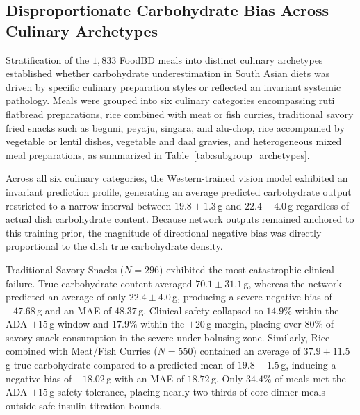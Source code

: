 \documentclass[utf8]{FrontiersinVancouver}
\begin{document}
\subsection{Disproportionate Carbohydrate Bias Across Culinary Archetypes}

Stratification of the $1,833$ FoodBD meals into distinct culinary archetypes established whether carbohydrate underestimation in South Asian diets was driven by specific culinary preparation styles or reflected an invariant systemic pathology. Meals were grouped into six culinary categories encompassing ruti flatbread preparations, rice combined with meat or fish curries, traditional savory fried snacks such as beguni, peyaju, singara, and alu-chop, rice accompanied by vegetable or lentil dishes, vegetable and daal gravies, and heterogeneous mixed meal preparations, as summarized in Table~\ref{tab:subgroup_archetypes}.

Across all six culinary categories, the Western-trained vision model exhibited an invariant prediction profile, generating an average predicted carbohydrate output restricted to a narrow interval between $19.8 \pm 1.3$\,g and $22.4 \pm 4.0$\,g regardless of actual dish carbohydrate content. Because network outputs remained anchored to this training prior, the magnitude of directional negative bias was directly proportional to the dish true carbohydrate density.

Traditional Savory Snacks ($N=296$) exhibited the most catastrophic clinical failure. True carbohydrate content averaged $70.1 \pm 31.1$\,g, whereas the network predicted an average of only $22.4 \pm 4.0$\,g, producing a severe negative bias of $-47.68$\,g and an MAE of $48.37$\,g. Clinical safety collapsed to $14.9\%$ within the ADA $\pm 15$\,g window and $17.9\%$ within the $\pm 20$\,g margin, placing over $80\%$ of savory snack consumption in the severe under-bolusing zone. Similarly, Rice combined with Meat/Fish Curries ($N=550$) contained an average of $37.9 \pm 11.5$\,g true carbohydrate compared to a predicted mean of $19.8 \pm 1.5$\,g, inducing a negative bias of $-18.02$\,g with an MAE of $18.72$\,g. Only $34.4\%$ of meals met the ADA $\pm 15$\,g safety tolerance, placing nearly two-thirds of core dinner meals outside safe insulin titration bounds.
\end{document}
